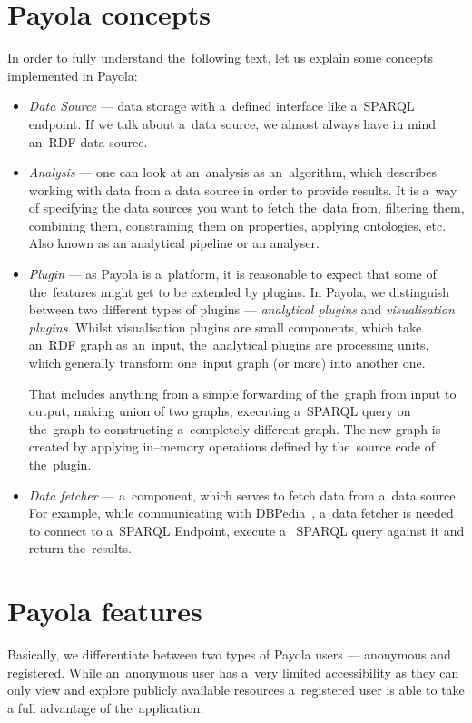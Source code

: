 \section{Payola concepts}
In order to fully understand the~following text, let us explain some concepts 
implemented in Payola:
\begin{itemize}
  \item \emph{Data Source} --- data storage with a~defined interface like a~SPARQL endpoint.
  If we talk about a~data source, we almost always have in mind an~RDF data source.
  
  \item \emph{Analysis} --- one can look at an~analysis as an~algorithm, which 
  describes working with data from a data source in order to provide results. 
  It is a~way of specifying the data sources you want to fetch the~data from, 
  filtering them, combining them, constraining them on properties, applying 
  ontologies, etc. Also known as an analytical pipeline or an analyser.  
  
  \item \emph{Plugin} --- as Payola is a~platform, it is reasonable to expect that 
  some of the~features might get to be extended by plugins. In 
  Payola, we distinguish between two different types of plugins --- \emph{analytical plugins} and 
  \emph{visualisation plugins}. Whilst visualisation plugins are small components, 
  which take an~RDF graph as an~input, the~analytical plugins are processing 
  units, which generally transform one~input graph (or more) into another one.
  
  That includes anything from a simple forwarding of the~graph from input to output, 
  making union of two graphs, executing a~SPARQL query on the~graph to constructing 
  a~completely different graph. The new graph is created by applying in--memory
  operations defined by the~source code of the~plugin.
  
  \item \emph{Data fetcher} --- a~component, which serves to fetch data from a~data 
  source. For example, while communicating with DBPedia~\cite{dbpedia},
  a~data fetcher is needed to connect to a~SPARQL Endpoint, execute a~
  SPARQL query against it and return the~results.
\end{itemize}

\section{Payola features}
Basically, we differentiate between two types of Payola users --- anonymous and registered. 
While an~anonymous user has a~very limited accessibility as they can only 
view and explore publicly available resources a~registered user is able to 
take a full advantage of the~application.

